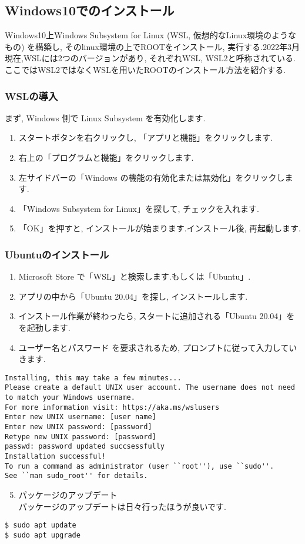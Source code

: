 \subsection{Windows10でのインストール}
Windows10上Windows Subsystem for Linux (WSL, 仮想的なLinux環境のようなもの) を構築し, そのlinux環境の上でROOTをインストール, 実行する.2022年3月現在,WSLには2つのバージョンがあり, それぞれWSL, WSL2と呼称されている.ここではWSL2ではなくWSLを用いたROOTのインストール方法を紹介する.

\subsubsection{WSLの導入}
まず, Windows 側で Linux Subsystem を有効化します.
\begin{enumerate}
    \item スタートボタンを右クリックし, 「アプリと機能」をクリックします.
    \item 右上の「プログラムと機能」をクリックします.
    \item 左サイドバーの「Windows の機能の有効化または無効化」をクリックします.
    \item 「Windows Subsystem for Linux」を探して, チェックを入れます.
    \item 「OK」を押すと, インストールが始まります.インストール後, 再起動します.
\end{enumerate}

\subsubsection{Ubuntuのインストール}
\begin{enumerate}
    \item Microsoft Store で「WSL」と検索します.もしくは「Ubuntu」.
    \item アプリの中から「Ubuntu 20.04」を探し, インストールします.
    \item インストール作業が終わったら, スタートに追加される「Ubuntu 20.04」をを起動します.
    \item ユーザー名とパスワード を要求されるため, プロンプトに従って入力していきます.
\end{enumerate}
\begin{lstlisting}[caption=表示されるスクリプト例]
Installing, this may take a few minutes...
Please create a default UNIX user account. The username does not need to match your Windows username.
For more information visit: https://aka.ms/wslusers
Enter new UNIX username: [user name]
Enter new UNIX password: [password]
Retype new UNIX password: [password]
passwd: password updated succsessfully
Installation successful!
To run a command as administrator (user ``root''), use ``sudo''.
See ``man sudo_root'' for details.
\end{lstlisting}
\begin{enumerate}
    \setcounter{enumi}{4}
    \item パッケージのアップデート\\
        パッケージのアップデートは日々行ったほうが良いです.
\end{enumerate}
\begin{lstlisting}
$ sudo apt update
$ sudo apt upgrade
\end{lstlisting}

